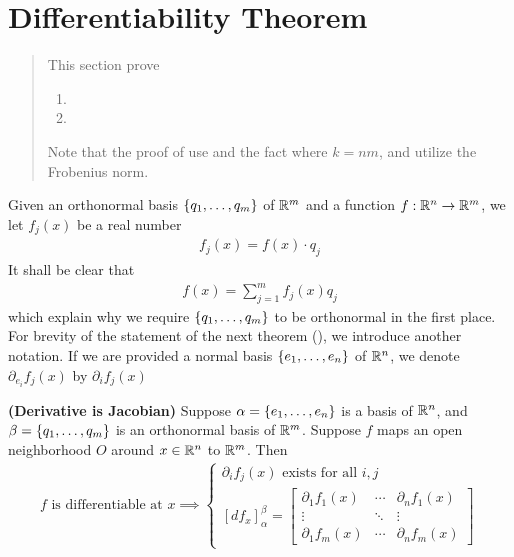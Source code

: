 \documentclass{report}
\begin{document}
\section{Differentiability Theorem}
\label{Chapter of DT}
\begin{abstract}
This section prove
\begin{enumerate}[label=(\alph*)]
  \item {}
  \item {}
\end{enumerate}
Note that the proof of  use  and the fact  where $k=nm$, and utilize the Frobenius norm. 
\end{abstract}
\begin{mdframed}
Given an orthonormal basis  $\{ q_1,\dots ,q_m \}$ of $\mathbb{R}^m$ and a function $f:\mathbb{R}^n \rightarrow \mathbb{R}^m$, we let $f_j(x)$ be a real number
\begin{align*}
f_j(x)=f(x)\cdot q_j
\end{align*}
It shall be clear that 
\begin{align*}
f(x)=\sum_{j=1}^m f_j(x)q_j
\end{align*}
which explain why we require $\{ q_1,\dots ,q_m \}$ to be orthonormal in the first place. For brevity of the statement of the next theorem (), we introduce another notation. If we are provided a normal basis $\{ e_1,\dots ,e_n \}$ of $\mathbb{R}^n$, we denote $\partial_{e_i} f_j(x)$ by $\partial_i f_j(x)$
\end{mdframed}
\begin{theorem}
\label{DiJ}
\textbf{(Derivative is Jacobian)} Suppose  $\alpha =\{ e_1,\dots ,e_n \}$ is a basis of $\mathbb{R}^n$, and $\beta =\{ q_1,\dots ,q_m \}$ is an orthonormal basis of  $\mathbb{R}^m$. Suppose  $f$ maps an open neighborhood $O$ around $x\in\mathbb{R}^n$ to $\mathbb{R}^m$.  Then 
\begin{align*}
  f\text{ is differentiable at }x\implies \begin{cases}
    \partial_{i}f_j(x)\text{ exists for all }i,j\\
    [df_x]_{\alpha }^{\beta }=\begin{bmatrix}
      \partial_1f_1(x)&\cdots & \partial_nf_1(x)\\
      \vdots & \ddots & \vdots\\
      \partial_1f_m(x) & \cdots & \partial_nf_m(x)
    \end{bmatrix}
  \end{cases}
\end{align*}
\end{theorem}
\end{document}
